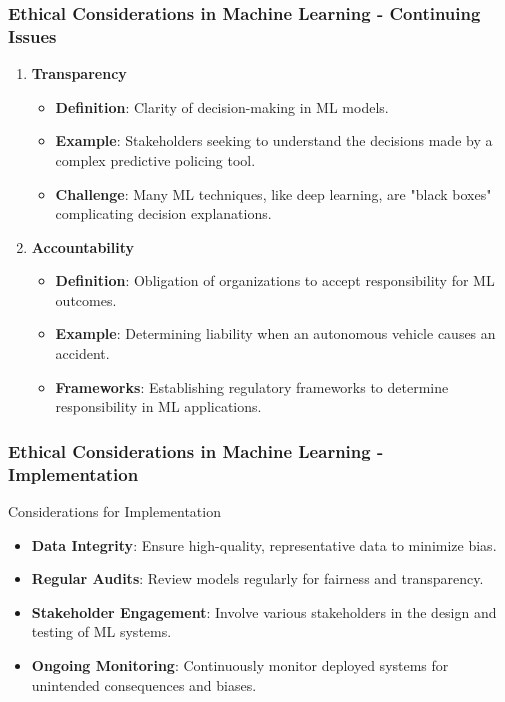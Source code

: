 \documentclass[aspectratio=169]{beamer}
\begin{document}
\begin{frame}[fragile]
    \frametitle{Ethical Considerations in Machine Learning - Continuing Issues}
    \begin{enumerate}[resume]
        \item \textbf{Transparency}
            \begin{itemize}
                \item \textbf{Definition}: Clarity of decision-making in ML models.
                \item \textbf{Example}: Stakeholders seeking to understand the decisions made by a complex predictive policing tool.
                \item \textbf{Challenge}: Many ML techniques, like deep learning, are "black boxes" complicating decision explanations.
            \end{itemize}
            
        \item \textbf{Accountability}
            \begin{itemize}
                \item \textbf{Definition}: Obligation of organizations to accept responsibility for ML outcomes.
                \item \textbf{Example}: Determining liability when an autonomous vehicle causes an accident.
                \item \textbf{Frameworks}: Establishing regulatory frameworks to determine responsibility in ML applications.
            \end{itemize}
    \end{enumerate}
\end{frame}

\begin{frame}[fragile]
    \frametitle{Ethical Considerations in Machine Learning - Implementation}
    \begin{block}{Considerations for Implementation}
        \begin{itemize}
            \item \textbf{Data Integrity}: Ensure high-quality, representative data to minimize bias.
            \item \textbf{Regular Audits}: Review models regularly for fairness and transparency.
            \item \textbf{Stakeholder Engagement}: Involve various stakeholders in the design and testing of ML systems.
            \item \textbf{Ongoing Monitoring}: Continuously monitor deployed systems for unintended consequences and biases.
        \end{itemize}
    \end{block}
\end{frame}
\end{document}
